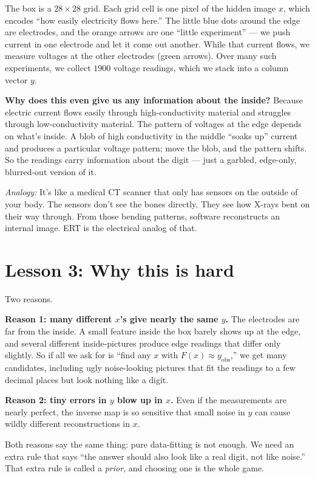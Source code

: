 \documentclass[11pt]{article}
\newcommand{\analogy}[1]{\par\smallskip\noindent\textit{Analogy:} #1\par\smallskip}
\begin{document}
The box is a $28\times 28$ grid. Each grid cell is one pixel of the
hidden image $x$, which encodes ``how easily electricity flows here.''
The little blue dots around the edge are electrodes, and the orange
arrows are one ``little experiment'' --- we push current in one
electrode and let it come out another. While that current flows, we
measure voltages at the other electrodes (green arrows). Over many such
experiments, we collect $1900$ voltage readings, which we stack into a
column vector $y$.

\textbf{Why does this even give us any information about the inside?}
Because electric current flows easily through high-conductivity material
and struggles through low-conductivity material. The pattern of voltages
at the edge depends on what's inside. A blob of high conductivity in the
middle ``soaks up'' current and produces a particular voltage pattern;
move the blob, and the pattern shifts. So the readings carry information
about the digit --- just a garbled, edge-only, blurred-out version of it.

\analogy{It's like a medical CT scanner that only has sensors on the
outside of your body. The sensors don't see the bones directly. They see
how X-rays bent on their way through. From those bending patterns,
software reconstructs an internal image. ERT is the electrical analog of
that.}

\section{Lesson 3: Why this is hard}

Two reasons.

\textbf{Reason 1: many different $x$'s give nearly the same $y$.} The
electrodes are far from the inside. A small feature inside the box
barely shows up at the edge, and several different inside-pictures
produce edge readings that differ only slightly. So if all we ask for
is ``find any $x$ with $F(x) \approx y_{\text{obs}}$,'' we get many
candidates, including ugly noise-looking pictures that fit the readings
to a few decimal places but look nothing like a digit.

\textbf{Reason 2: tiny errors in $y$ blow up in $x$.} Even if the
measurements are nearly perfect, the inverse map is so sensitive that
small noise in $y$ can cause wildly different reconstructions in $x$.

Both reasons say the same thing: pure data-fitting is not enough. We
need an extra rule that says ``the answer should also look like a real
digit, not like noise.'' That extra rule is called a \emph{prior}, and
choosing one is the whole game.
\end{document}
